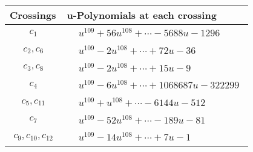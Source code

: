\documentclass[1p]{elsarticle_modified}
\theoremstyle{definition}
\begin{document}
\begin{tabular}{m{50pt}|m{274pt}}
Crossings & \hspace{64pt}u-Polynomials at each crossing \\
\hline $$\begin{aligned}c_{1}\end{aligned}$$&$\begin{aligned}
&u^{109}+56 u^{108}+\cdots-5688 u-1296
\end{aligned}$\\
\hline $$\begin{aligned}c_{2},c_{6}\end{aligned}$$&$\begin{aligned}
&u^{109}-2 u^{108}+\cdots+72 u-36
\end{aligned}$\\
\hline $$\begin{aligned}c_{3},c_{8}\end{aligned}$$&$\begin{aligned}
&u^{109}-2 u^{108}+\cdots+15 u-9
\end{aligned}$\\
\hline $$\begin{aligned}c_{4}\end{aligned}$$&$\begin{aligned}
&u^{109}-6 u^{108}+\cdots+1068687 u-322299
\end{aligned}$\\
\hline $$\begin{aligned}c_{5},c_{11}\end{aligned}$$&$\begin{aligned}
&u^{109}+u^{108}+\cdots-6144 u-512
\end{aligned}$\\
\hline $$\begin{aligned}c_{7}\end{aligned}$$&$\begin{aligned}
&u^{109}-52 u^{108}+\cdots-189 u-81
\end{aligned}$\\
\hline $$\begin{aligned}c_{9},c_{10},c_{12}\end{aligned}$$&$\begin{aligned}
&u^{109}-14 u^{108}+\cdots+7 u-1
\end{aligned}$\\
\hline
\end{tabular}\\~\\
\newpage\renewcommand{\arraystretch}{1}
\end{document}
